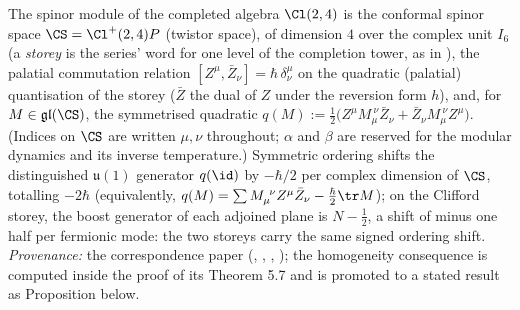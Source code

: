 The spinor module of the completed algebra $\Cl(2,4)$ is the conformal spinor space $\CS = \Cl^+(2,4)P$ (twistor space), of dimension $4$ over the complex unit $I_6$ (a \emph{storey} is the series' word for one level of the completion tower, as in \cite{ButlerT9}), the palatial commutation relation $[Z^\mu, \bar Z_\nu] = \hbar\,\delta^\mu_\nu$ on the quadratic (palatial) quantisation of the storey ($\bar Z$ the dual of $Z$ under the reversion form $h$), and, for $M \in \mathfrak{gl}(\CS)$, the symmetrised quadratic $q(M) := \tfrac12\bigl(Z^\mu M_\mu^{\ \nu}\bar Z_\nu + \bar Z_\nu M_\mu^{\ \nu} Z^\mu\bigr)$. (Indices on $\CS$ are written $\mu, \nu$ throughout; $\alpha$ and $\beta$ are reserved for the modular dynamics and its inverse temperature.) Symmetric ordering shifts the distinguished $\mathfrak{u}(1)$ generator $q(\id)$ by $-\hbar/2$ per complex dimension of $\CS$, totalling $-2\hbar$ (equivalently, $q(M) = \sum M_\mu^{\ \nu} Z^\mu \bar Z_\nu - \tfrac{\hbar}{2}\tr M$); on the Clifford storey, the boost generator of each adjoined plane is $N - \tfrac12$, a shift of minus one half per fermionic mode: the two storeys carry the same signed ordering shift. \emph{Provenance:} the correspondence paper \cite[Thm.~3.1, Rem.~3.2, \S 5, Lem.~5.5, Prop.~5.6, Thm.~5.7]{ButlerT9} (, , , ); the homogeneity consequence is computed inside the proof of its Theorem 5.7 and is promoted to a stated result as Proposition  below.
